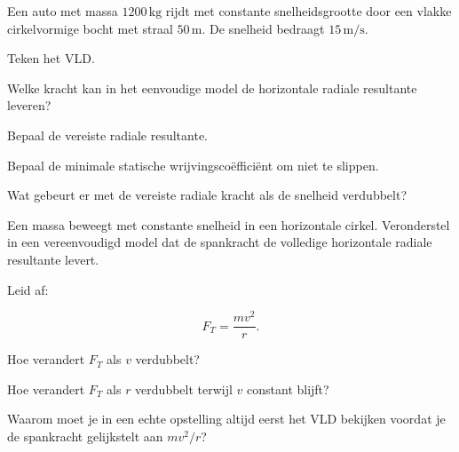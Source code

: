 \documentclass{ximera}
\begin{document}
\begin{oefening}{\oefU\ESS}

Een auto met massa $1200\,\mathrm{kg}$ rijdt met constante
snelheidsgrootte door een vlakke cirkelvormige bocht met straal
$50\,\mathrm m$. De snelheid bedraagt $15\,\mathrm{m/s}$.

\begin{question}
Teken het VLD.
\end{question}

\begin{question}
Welke kracht kan in het eenvoudige model de horizontale radiale
resultante leveren?
\end{question}

\begin{question}
Bepaal de vereiste radiale resultante.
\end{question}

\begin{question}
Bepaal de minimale statische wrijvingscoëfficiënt om niet te slippen.
\end{question}

\begin{question}
Wat gebeurt er met de vereiste radiale kracht als de snelheid
verdubbelt?
\end{question}

\end{oefening}


\begin{oefening}{\oefU}

Een massa beweegt met constante snelheid in een horizontale cirkel.
Veronderstel in een vereenvoudigd model dat de spankracht de volledige
horizontale radiale resultante levert.

\begin{question}
Leid af:

\[
F_T=\frac{mv^2}{r}.
\]

\end{question}

\begin{question}
Hoe verandert $F_T$ als $v$ verdubbelt?
\end{question}

\begin{question}
Hoe verandert $F_T$ als $r$ verdubbelt terwijl $v$ constant blijft?
\end{question}

\begin{question}
Waarom moet je in een echte opstelling altijd eerst het VLD bekijken
voordat je de spankracht gelijkstelt aan $mv^2/r$?
\end{question}

\end{oefening}
\end{document}
